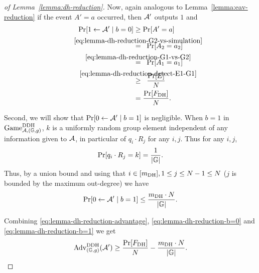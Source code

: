 \begin{proof}[of Lemma~\ref{lemma:dh-reduction}]
	Now, again analogous to Lemma~\ref{lemma:eav-reduction} if the event $A' = a$ occurred, then $\mathcal{A}'$ outputs $1$ and
	\begin{align*}
		\pr{1 \from \adv' \mid b = 0} & \ge \pr{A' = a}                                                                             \\
		                              & \stackrel{\mathclap{\eqref{eq:lemma-dh-reduction-G2-vs-simulation}}}{=} \;\; \pr{A_2 = a_2} \\
		                              & \stackrel{\mathclap{\eqref{eq:lemma-dh-reduction-G1-vs-G2}}}{=} \;\; \pr{A_1 = a_1}         \\
		                              & \stackrel{\mathclap{\eqref{eq:lemma-dh-reduction-detect-E1-G1}}}{\ge} \;\; \frac{\pr{E}}{N} \\
		                              & = \frac{\pr{\fdh}}{N}.
	\end{align*}

	Second, we will show that $\pr{0 \from \adv' \mid b = 1}$ is negligible. When $b = 1$ in $\mathrm{Game}_{\mathcal{A}, (\mathbb{G}, g)}^{\mathrm{DDH}}$, $k$ is a uniformly random group element independent of any information given to $\mathcal{A}$, in particular of $q_i \cdot R_j$ for any $i, j$. Thus for any $i, j$,
	\[
		\pr{q_i \cdot R_j = k} = \frac{1}{\abs{\mathbb{G}}}.
	\]
	Thus, by a union bound and using that $i \in [m_\mathrm{DH}], 1 \le j \le N - 1 \le N$ ($j$ is bounded by the maximum out-degree) we have
	\begin{equation} \label{eq:lemma-dh-reduction-b=1}
		\pr{0 \from \adv' \mid b = 1} \le \frac{\mdh \cdot N}{\abs{\mathbb{G}}}.
	\end{equation}

	Combining \eqref{eq:lemma-dh-reduction-advantage}, \eqref{eq:lemma-dh-reduction-b=0} and \eqref{eq:lemma-dh-reduction-b=1} we get
	\begin{align} \label{eq:lemma-dh-reduction-advantage-lower-bound}
		\begin{split}
			\mathrm{Adv}_{(\mathbb{G}, g)}^{\mathrm{DDH}}(\adv') \ge \frac{\pr{\fdh}}{N} - \frac{\mdh \cdot N}{\abs{\mathbb{G}}}.
		\end{split}
	\end{align}


\end{proof}
